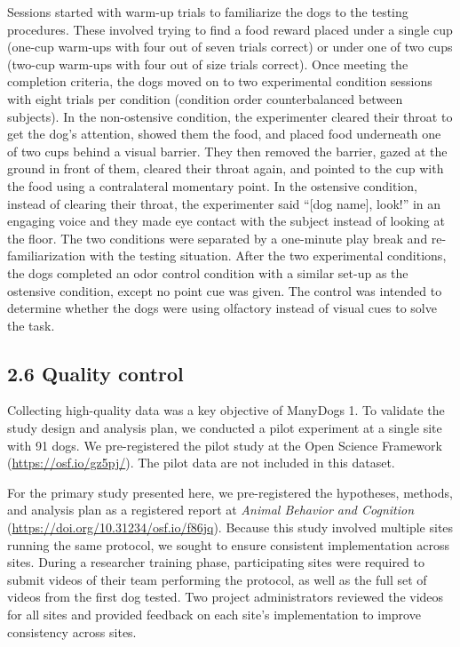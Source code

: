 \documentclass[
  man,floatsintext]{apa6}
\begin{document}
Sessions started with warm-up trials to familiarize the dogs to the testing procedures. These involved trying to find a food reward placed under a single cup (one-cup warm-ups with four out of seven trials correct) or under one of two cups (two-cup warm-ups with four out of size trials correct). Once meeting the completion criteria, the dogs moved on to two experimental condition sessions with eight trials per condition (condition order counterbalanced between subjects). In the non-ostensive condition, the experimenter cleared their throat to get the dog's attention, showed them the food, and placed food underneath one of two cups behind a visual barrier. They then removed the barrier, gazed at the ground in front of them, cleared their throat again, and pointed to the cup with the food using a contralateral momentary point. In the ostensive condition, instead of clearing their throat, the experimenter said ``{[}dog name{]}, look!'' in an engaging voice and they made eye contact with the subject instead of looking at the floor. The two conditions were separated by a one-minute play break and re-familiarization with the testing situation. After the two experimental conditions, the dogs completed an odor control condition with a similar set-up as the ostensive condition, except no point cue was given. The control was intended to determine whether the dogs were using olfactory instead of visual cues to solve the task.

\hypertarget{quality-control}{%
\subsection{2.6 Quality control}\label{quality-control}}

Collecting high-quality data was a key objective of ManyDogs 1. To validate the study design and analysis plan, we conducted a pilot experiment at a single site with 91 dogs. We pre-registered the pilot study at the Open Science Framework (\url{https://osf.io/gz5pj/}). The pilot data are not included in this dataset.

For the primary study presented here, we pre-registered the hypotheses, methods, and analysis plan as a registered report at \emph{Animal Behavior and Cognition} (\url{https://doi.org/10.31234/osf.io/f86jq}). Because this study involved multiple sites running the same protocol, we sought to ensure consistent implementation across sites. During a researcher training phase, participating sites were required to submit videos of their team performing the protocol, as well as the full set of videos from the first dog tested. Two project administrators reviewed the videos for all sites and provided feedback on each site's implementation to improve consistency across sites.
\end{document}
